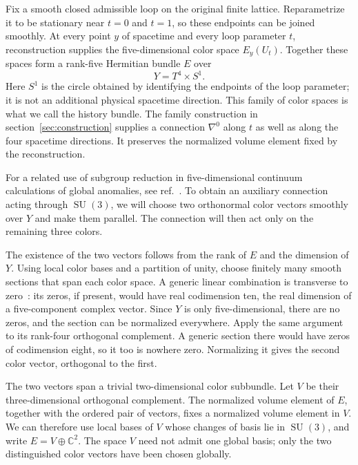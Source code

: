 \documentclass[11pt,a4paper]{article}
\theoremstyle{remark}
\DeclareMathOperator{\SU}{SU}
\begin{document}
Fix a smooth closed admissible loop on the original finite lattice.
Reparametrize it to be stationary near $t=0$ and $t=1$, so these endpoints
can be joined smoothly. At every point $y$ of spacetime and every loop
parameter $t$, reconstruction supplies the five-dimensional color space
$E_y(U_t)$. Together these spaces form a rank-five Hermitian bundle $E$
over
\begin{equation}
 Y=T^4\times S^1.
\end{equation}
Here $S^1$ is the circle obtained by identifying the endpoints of the
loop parameter; it is not an additional physical spacetime direction.
This family of color spaces is what we call the history bundle.
The family construction in section~\ref{sec:construction} supplies a
connection $\nabla^0$ along $t$ as well as along the four spacetime
directions. It preserves the normalized volume element fixed by the
reconstruction.

For a related use of subgroup reduction in five-dimensional continuum calculations of global anomalies, see ref.~\cite[sec.~3.1.2]{GarciaEtxebarriaMontero}. To obtain an auxiliary connection acting through $\SU(3)$, we will choose
two orthonormal color vectors smoothly over $Y$ and make them parallel.
The connection will then act only on the remaining three colors.

The existence of the two vectors follows from the rank of $E$ and the dimension of
$Y$. Using local color bases and a partition of unity, choose finitely
many smooth sections that span each color space. A generic linear
combination is transverse to zero~\cite[Ch.~3, Theorem~2.7]{Hirsch}:
its zeros, if present, would have real codimension ten, the real dimension
of a five-component complex vector. Since $Y$ is only five-dimensional,
there are no zeros, and the section can be normalized everywhere.
Apply the same argument to its rank-four orthogonal complement. A generic
section there would have zeros of codimension eight, so it too is nowhere
zero. Normalizing it gives the second color vector, orthogonal to the first.

The two vectors span a trivial two-dimensional color subbundle. Let $V$
be their three-dimensional orthogonal complement. The normalized volume
element of $E$, together with the ordered pair of vectors, fixes a
normalized volume element in $V$. We can therefore use local bases of $V$
whose changes of basis lie in $\SU(3)$, and write
$E=V\oplus\mathbb C^2$. The space $V$ need not admit one global basis;
only the two distinguished color vectors have been chosen globally.
\end{document}
